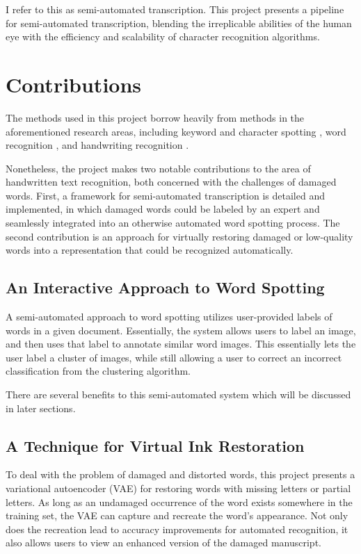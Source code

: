 \documentclass[final]{ukthesis}
\begin{document}
I refer to this as semi-automated transcription. This project presents a pipeline for semi-automated transcription, blending the irreplicable abilities of the human eye with the efficiency and scalability of character recognition algorithms.



%
%
\section{Contributions}
The methods used in this project borrow heavily from methods in the aforementioned research areas, including keyword and character spotting \cite{sharma2015adapting,frinken2012novel}, word recognition \cite{howe2009finding}, and handwriting recognition \cite{fischer2013fast,bluche2013feature}.

Nonetheless, the project makes two notable contributions to the area of handwritten text recognition, both concerned with the challenges of damaged words. First, a framework for semi-automated transcription is detailed and implemented, in which damaged words could be labeled by an expert and seamlessly integrated into an otherwise automated word spotting process. The second contribution is an approach for virtually restoring damaged or low-quality words into a representation that could be recognized automatically.


\subsection{An Interactive Approach to Word Spotting}
A semi-automated approach to word spotting utilizes user-provided labels of words in a given document. Essentially, the system allows users to label an image, and then uses that label to annotate similar word images. This essentially lets the user label a cluster of images, while still allowing a user to correct an incorrect classification from the clustering algorithm.

There are several benefits to this semi-automated system which will be discussed in later sections.


\subsection{A Technique for Virtual Ink Restoration}
To deal with the problem of damaged and distorted words, this project presents a variational autoencoder (VAE) for restoring words with missing letters or partial letters. As long as an undamaged occurrence of the word exists somewhere in the training set, the VAE can capture and recreate the word's appearance. Not only does the recreation lead to accuracy improvements for automated recognition, it also allows users to view an enhanced version of the damaged manuscript.
\end{document}
